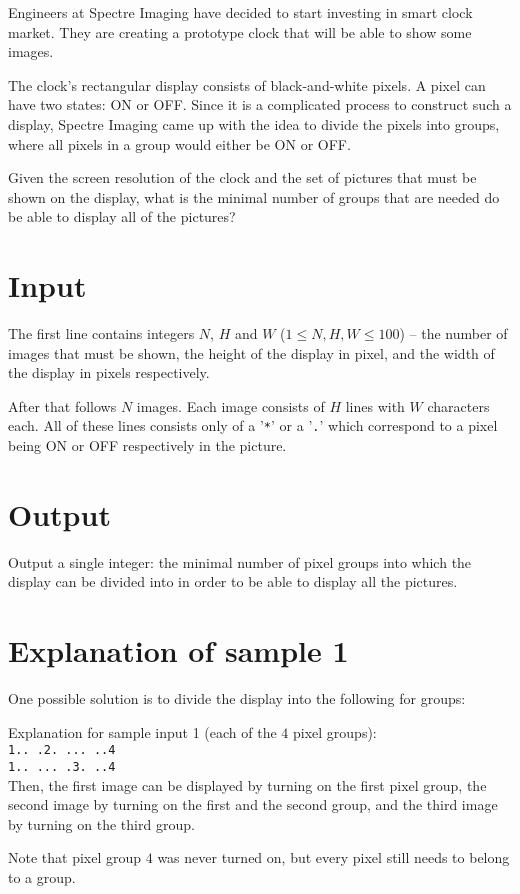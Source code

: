 Engineers at Spectre Imaging have decided to start investing in smart clock market.
They are creating a prototype clock that will be able to show some images.

The clock's rectangular display consists of black-and-white pixels.
A pixel can have two states: ON or OFF.
Since it is a complicated process to construct such a display, Spectre Imaging came up with the idea to divide the pixels into groups, where all pixels in a group would either be ON or OFF.

Given the screen resolution of the clock and the set of pictures that must be shown on the display, what is the minimal number of groups that are needed do be able to display all of the pictures?

\section*{Input}
The first line contains integers $N$, $H$ and $W$ ($1 \leq N, H, W \leq 100$) -- the number of images that must be shown, the height of the display in pixel, and the width of the display in pixels respectively.

After that follows $N$ images.
Each image consists of $H$ lines with $W$ characters each.
All of these lines consists only of a '\texttt{*}' or a '\texttt{.}' which correspond to a pixel being ON or OFF respectively in the picture.

\section*{Output}
Output a single integer: the minimal number of pixel groups into which the display can be divided into in order to be able to display all the pictures.

\section*{Explanation of sample 1}
One possible solution is to divide the display into the following for groups:

Explanation for sample input 1 (each of the $4$ pixel groups): \\
\texttt{1.. .2. ... ..4} \\
\texttt{1.. ... .3. ..4} \\

Then, the first image can be displayed by turning on the first pixel group, the second image by turning on the first and the second group, and the third image by turning on the third group.

Note that pixel group $4$ was never turned on, but every pixel still needs to belong to a group.
